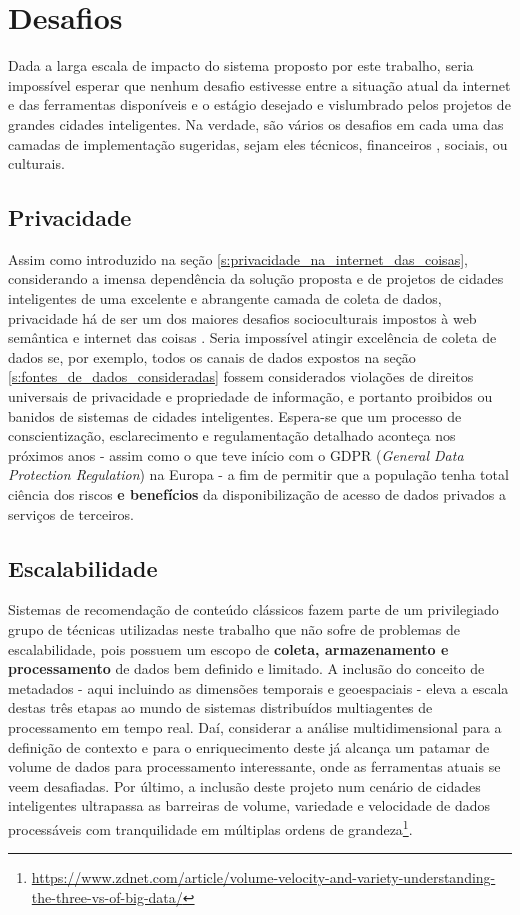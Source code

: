 \chapter{Desafios}

Dada a larga escala de impacto do sistema proposto por este trabalho, seria impossível esperar que nenhum desafio estivesse entre a situação atual da internet e das ferramentas disponíveis e o estágio desejado e vislumbrado pelos projetos de grandes cidades inteligentes. Na verdade, são vários os desafios em cada uma das camadas de implementação sugeridas, sejam eles técnicos, financeiros , sociais, ou culturais.

\section{Privacidade}

Assim como introduzido na seção \ref{s:privacidade_na_internet_das_coisas}, considerando a imensa dependência da solução proposta e de projetos de cidades inteligentes de uma excelente e abrangente camada de coleta de dados, privacidade há de ser um dos maiores desafios socioculturais impostos à web semântica e internet das coisas \cite{Kirrane2018PrivacySA}. Seria impossível atingir excelência de coleta de dados se, por exemplo, todos os canais de dados expostos na seção \ref{s:fontes_de_dados_consideradas} fossem considerados violações de direitos universais de privacidade e propriedade de informação, e portanto proibidos ou banidos de sistemas de cidades inteligentes. Espera-se que um processo de conscientização, esclarecimento e regulamentação detalhado aconteça nos próximos anos \cite{security:web3.0} - assim como o que teve início com o GDPR (\textit{General Data Protection Regulation}) na Europa - a fim de permitir que a população tenha total ciência dos riscos \textbf{e benefícios} da disponibilização de acesso de dados privados a serviços de terceiros.

\section{Escalabilidade}

Sistemas de recomendação de conteúdo clássicos fazem parte de um privilegiado grupo de técnicas utilizadas neste trabalho que não sofre de problemas de escalabilidade, pois possuem um escopo de \textbf{coleta, armazenamento e processamento} de dados bem definido e limitado. A inclusão do conceito de metadados - aqui incluindo as dimensões temporais e geoespaciais - eleva a escala destas três etapas ao mundo de sistemas distribuídos multiagentes de processamento em tempo real. Daí, considerar a análise multidimensional para a definição de contexto e para o enriquecimento deste já alcança um patamar de volume de dados para processamento interessante, onde as ferramentas atuais se veem desafiadas. Por último, a inclusão deste projeto num cenário de cidades inteligentes ultrapassa as barreiras de volume, variedade e velocidade de dados processáveis com tranquilidade em múltiplas ordens de grandeza\footnote{\url{https://www.zdnet.com/article/volume-velocity-and-variety-understanding-the-three-vs-of-big-data/}}.

